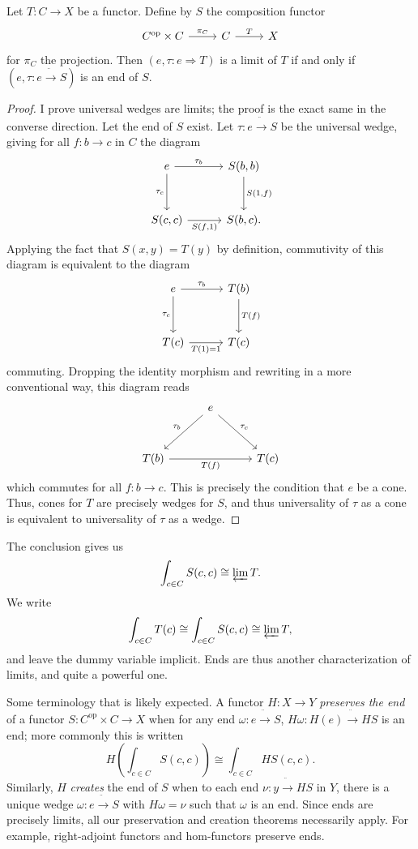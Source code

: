 \begin{proposition}\label{prp:9.3}
	Let $T : C \to X$ be a functor. Define by $S$ the composition functor
	\[\begin{tikzcd}[row sep = 2.5em, column sep = 2.5em]
	C^{\mathrm{op} } \times C \ar[" \pi_C ", r]  & C \ar[" T ", r]  & X
	\end{tikzcd}\]
	for $\pi_C$ the projection. Then $(e,\tau : e \Rightarrow T)$ is a limit of $T$ if and only if $(e,\tau : e \ddot{\to} S)$ is an end of $S$.
\end{proposition}
\begin{proof}
	I prove universal wedges are limits; the proof is the exact same in the converse direction. Let the end of $S$ exist. Let $\tau: e \ddot{\to} S$ be the universal wedge, giving for all $f : b \to c$ in $C$ the diagram
	\[\begin{tikzcd}[row sep = 3em, column sep = 3em]
	e \ar[" \tau_b ", r] \ar[" \tau_c "', d]  & S(b,b)\ar[" S(1\text{,} f) ", d]  \\
	S(c,c)\ar[" S(f\text{,} 1) "', r]  & S(b,c).
	\end{tikzcd}\]
	Applying the fact that $S(x,y)=T(y)$ by definition, commutivity of this diagram is equivalent to the diagram
	\[\begin{tikzcd}[row sep = 3em, column sep = 3em]
	e \ar[" \tau_b ", r] \ar[" \tau_c "', d]  & T(b)\ar[" T(f) ", d]  \\
	T(c)\ar[" T(1)=1 "', r]  & T(c)
	\end{tikzcd}\]
	commuting. Dropping the identity morphism and rewriting in a more conventional way, this diagram reads
	\[\begin{tikzcd}[row sep = 3em, column sep = 3em]
	 & e \ar[" \tau_c ", dr] \ar[" \tau_b "', dl]  &  \\
	T(b)\ar[" T(f) "', rr]  &  & T(c)
	\end{tikzcd}\]
	which commutes for all $f : b \to c$. This is precisely the condition that $e$ be a cone. Thus, cones for $T$ are precisely wedges for $S$, and thus universality of $\tau$ as a cone is equivalent to universality of $\tau$ as a wedge.
\end{proof}

The conclusion gives us
\[
	\int_{c\in C} S(c,c)\cong \varprojlim T
.\]
We write
\[
	\int_{c\in C} T(c) \cong \int_{c\in C} S(c,c) \cong \varprojlim T,
\]
and leave the dummy variable implicit. Ends are thus another characterization of limits, and quite a powerful one.

Some terminology that is likely expected. A functor $H : X \to Y$ \emph{preserves the end} of a functor $S : C^{\mathrm{op}} \times C \to X$ when for any end $\omega: e \ddot{\to} S$, $H\omega : H(e) \ddot{\to} HS$ is an end; more commonly this is written
\[
	H\left( \int_{c\in C} S(c,c) \right) \cong \int_{c\in C} HS(c,c)
.\]
Similarly, $H$ \emph{creates} the end of $S$ when to each end $\nu : y \ddot{\to} HS$ in $Y$, there is a unique wedge $\omega: e \ddot{\to} S$ with $H\omega=\nu$ such that $\omega$ is an end. Since ends are precisely limits, all our preservation and creation theorems necessarily apply. For example, right-adjoint functors and hom-functors preserve ends.


